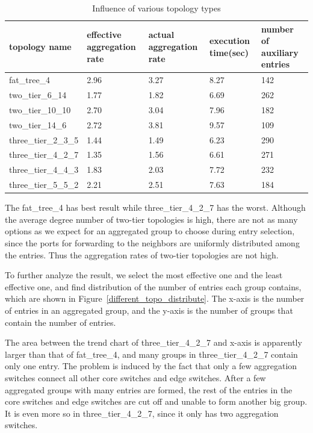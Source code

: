 \documentclass[conference]{IEEEtran}
\begin{document}
\begin{table}
\centering
\caption{Influence of various topology types}
\begin{tabular}{|p{1.8cm}|p{1cm}|p{1.3cm}|p{1.1cm}|p{1.3cm}|}
\hline topology name & effective aggregation rate & actual aggregation rate & execution time(sec) & number of auxiliary entries \\
\hline
\hline fat\_tree\_4 & 2.96 & 3.27 & 8.27 & 142 \\
\hline two\_tier\_6\_14 & 1.77 & 1.82 & 6.69 & 262 \\ 
\hline two\_tier\_10\_10 & 2.70 & 3.04 & 7.96 & 182 \\
\hline two\_tier\_14\_6 & 2.72 & 3.81 & 9.57 & 109 \\ 
\hline three\_tier\_2\_3\_5 & 1.44 & 1.49 & 6.23 & 290 \\
\hline three\_tier\_4\_2\_7 & 1.35 & 1.56 & 6.61 & 271 \\
\hline three\_tier\_4\_4\_3 & 1.83 & 2.03 & 7.72 & 232 \\
\hline three\_tier\_5\_5\_2 & 2.21 & 2.51 & 7.63 & 184 \\
\hline
\end{tabular}
\label{table:different_topo_type}
\end{table}
The fat\_tree\_4 has best result while three\_tier\_4\_2\_7 has the worst. Although the average degree number of two-tier topologies is high, there are not as many options as we expect for an aggregated group to choose during entry selection, since the ports for forwarding to the neighbors are uniformly distributed among the entries. Thus the aggregation rates of two-tier topologies are not high.

To further analyze the result, we select the most effective one and the least effective one, and find distribution of the number of entries each group contains, which are shown in Figure~\ref{different_topo_distribute}. The x-axis is the number of entries in an aggregated group, and the y-axis is the number of groups that contain the number of entries.

The area between the trend chart of three\_tier\_4\_2\_7 and x-axis is apparently larger than that of fat\_tree\_4, and many groups in three\_tier\_4\_2\_7 contain only one entry. The problem is induced by the fact that only a few aggregation switches connect all other core switches and edge switches. After a few aggregated groups with many entries are formed, the rest of the entries in the core switches and edge switches are cut off and unable to form another big group. It is even more so in three\_tier\_4\_2\_7, since it only has two aggregation switches. 
\end{document}
